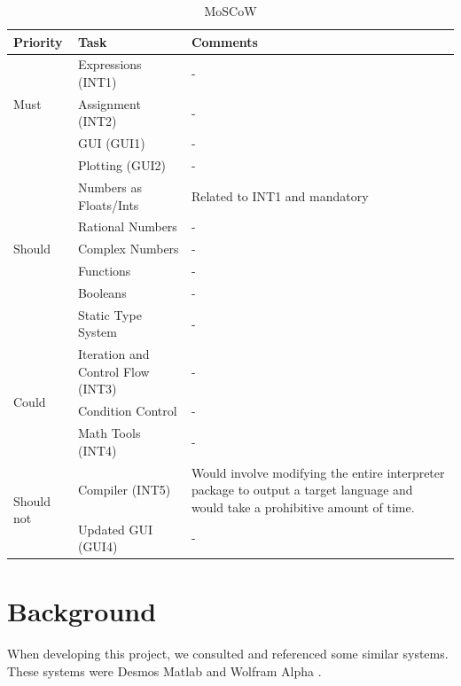 \documentclass[a4paper, oneside, 11pt]{report}
\begin{document}
	\begin{table}[h]
		\caption{MoSCoW}
		\begin{center}
			\begin{tabular}{|p{1in}|p{2in}|p{2.5in}|} \hline
			Priority & Task & Comments \\ \hline \hline

			\multirow{3}{1in}{Must}
			& Expressions (INT1) & - \\ \cline{2-3}
			& Assignment (INT2) & - \\ \cline{2-3}
			& GUI (GUI1) & - \\ \cline{2-3}
			& Plotting (GUI2) & - \\ \cline{2-3}
			& Numbers as Floats/Ints & Related to INT1 and mandatory \\ \hline \hline

			\multirow{3}{1in}{Should}
			& Rational Numbers & - \\ \cline{2-3}
			& Complex Numbers & - \\ \cline{2-3}
			& Functions & - \\ \cline{2-3}
			& Booleans & - \\ \cline{2-3}
			& Static Type System & - \\ \hline \hline

			\multirow{3}{1in}{Could}
			& Iteration and Control Flow (INT3) & - \\ \cline{2-3}
			& Condition Control & - \\ \cline{2-3}
			& Math Tools (INT4) & - \\ \hline \hline

			\multirow{3}{1in}{Should not}
			& Compiler (INT5) & Would involve modifying the entire interpreter package to output a target language and would take a prohibitive amount of time. \\ \cline{2-3}
			& Updated GUI (GUI4) & - \\ \hline
			\end{tabular}
			\label{Table1}
		\end{center}
	\end{table}

	\chapter{Background}

	When developing this project, we consulted and referenced some similar systems. These systems were Desmos \citep{Desmos:2023} Matlab \citep{Matlab:2023} and Wolfram Alpha \citep{Wolfram-Alpha:2025}. \\
\end{document}
